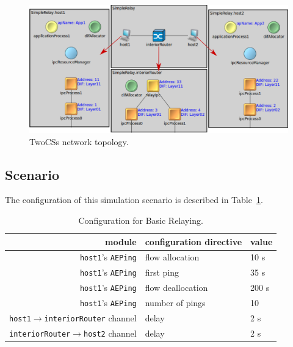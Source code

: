            \begin{figure}[H]
                \begin{center}
                    \includegraphics[width=\textwidth]{fig/tests_simplerelay.png}
                  \caption{TwoCSs network topology.}
                  \label{fig:examples:simplerelay}
                \end{center}
            \end{figure}

        \subsection{Scenario}

            The configuration of this simulation scenario is described in Table~\ref{fig:examples:relaying:config}.

            \begin{table}[H]
                \begin{center}
                  \begin{tabular}{ | r | l | l | }
                    \hline
                    module & configuration directive & value \\
                    \hline
                    \texttt{host1}'s \texttt{AEPing} & flow allocation & 10 s \\
                    \texttt{host1}'s \texttt{AEPing} & first ping & 35 s \\
                    \texttt{host1}'s \texttt{AEPing} & flow deallocation & 200 s \\
                    \texttt{host1}'s \texttt{AEPing} & number of pings & 10 \\
                    \texttt{host1}$\rightarrow$\texttt{interiorRouter} channel & delay & 2 s \\
                    \texttt{interiorRouter}$\rightarrow$\texttt{host2} channel & delay & 2 s \\
                    \hline
                  \end{tabular}
                  \caption{Configuration for Basic Relaying.}
                  \label{fig:examples:relaying:config}
                \end{center}
            \end{table}

